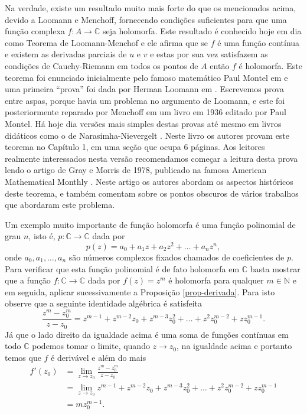 Na verdade, existe um resultado muito mais forte do que os mencionados acima, 
devido a Loomann e Menchoff, 
fornecendo condições suficientes para que uma função 
complexa $f:A\to\mathbb{C}$ seja holomorfa. Este resultado é conhecido hoje 
em dia como Teorema de Loomann-Menchof e ele afirma que se $f$ é uma função contínua 
e existem as derivadas parciais de $u$ e $v$ e estas por sua vez satisfazem as condições de 
Cauchy-Riemann em todos os pontos de $A$ então $f$ é holomorfa.
Este teorema foi enunciado inicialmente pelo famoso matemático Paul Montel em \cite{Montel13} e uma primeira ``prova'' foi dada por 
Herman Loomann em \cite{Loomann23}. Escrevemos  prova entre aspas, porque havia um problema no argumento de Loomann, 
e este foi posteriormente reparado por Menchoff em um livro \cite{Menchoff36} em 1936 editado por Paul Montel. 
Há hoje dia versões mais simples destas provas até mesmo
em livros didáticos como o de Narasimha-Nievergelt \cite{MR1803086}. 
Neste livro os autores provam este teorema no Capítulo 1, em uma seção que ocupa 6 páginas. 
Aos leitores realmente interessados nesta versão recomendamos começar a leitura desta prova
lendo o artigo de Gray e Morris de 1978, publicado na famosa American Mathematical Monthly \cite{MR470179}.
Neste artigo os autores abordam os aspectos históricos deste teorema, 
e também comentam sobre os pontos obscuros de vários trabalhos que abordaram este problema.

\bigskip


Um exemplo muito importante de função holomorfa é uma função polinomial de grau $n$,
isto é, $p:\mathbb{C}\to\mathbb{C}$ dada por 
\[
p(z)= a_0+a_1z+a_2z^2+\ldots +a_nz^n,
\]
onde $a_0,a_1,\ldots,a_n$ são números complexos fixados chamados de coeficientes de $p$.
Para verificar que esta função polinomial é de fato holomorfa em $\mathbb{C}$ basta mostrar
que a função $f:\mathbb{C}\to\mathbb{C}$ dada por $f(z)=z^m$ é holomorfa para qualquer $m\in \mathbb{N}$
e em seguida, aplicar sucessivamente a Proposição \ref{prop-derivada}.
Para isto observe que a seguinte identidade algébrica é satisfeita
\[
\frac{z^m-z_0^m}{z-z_0}
=
z^{m-1}+z^{m-2}z_0+z^{m-3}z_0^2+\ldots+z^{2}z_0^{m-2}+zz_0^{m-1}.
\] 
Já que o lado direito da igualdade acima é uma soma de funções contínuas em todo $\mathbb{C}$ 
podemos tomar o limite, quando $z\to z_0$, na igualdade acima e portanto temos que $f$ é derivável e além do mais
\begin{align*}
f'(z_0) 
&= 
\lim_{z\to z_0} \frac{z^m-z_0^m}{z-z_0}
\\
&=
\lim_{z\to z_0} 
z^{m-1}+z^{m-2}z_0+z^{m-3}z_0^2+\ldots+z^{2}z_0^{m-2}+zz_0^{m-1}
\\
&=
mz_{0}^{m-1}.
\end{align*}

